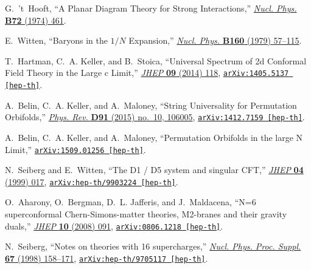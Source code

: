 \begin{thebibliography}{100}
G.~'t~Hooft, ``{A Planar Diagram Theory for Strong Interactions},''
\href{http://dx.doi.org/10.1016/0550-3213(74)90154-0}{{\em Nucl. Phys.} {\bf
  B72} (1974)  461}.

E.~Witten, ``{Baryons in the $1/N$ Expansion},''
\href{http://dx.doi.org/10.1016/0550-3213(79)90232-3}{{\em Nucl. Phys.} {\bf
  B160} (1979)  57--115}.

T.~Hartman, C.~A. Keller, and B.~Stoica, ``{Universal Spectrum of 2d Conformal
  Field Theory in the Large c Limit},''
  \href{http://dx.doi.org/10.1007/JHEP09(2014)118}{{\em JHEP} {\bf 09} (2014)
  118},
\href{http://arxiv.org/abs/1405.5137}{{\tt arXiv:1405.5137 [hep-th]}}.

A.~Belin, C.~A. Keller, and A.~Maloney, ``{String Universality for Permutation
  Orbifolds},'' \href{http://dx.doi.org/10.1103/PhysRevD.91.106005}{{\em Phys.
  Rev.} {\bf D91} (2015) no.~10, 106005},
\href{http://arxiv.org/abs/1412.7159}{{\tt arXiv:1412.7159 [hep-th]}}.

A.~Belin, C.~A. Keller, and A.~Maloney, ``{Permutation Orbifolds in the large N
  Limit},''
\href{http://arxiv.org/abs/1509.01256}{{\tt arXiv:1509.01256 [hep-th]}}.

N.~Seiberg and E.~Witten, ``{The D1 / D5 system and singular CFT},''
  \href{http://dx.doi.org/10.1088/1126-6708/1999/04/017}{{\em JHEP} {\bf 04}
  (1999)  017},
\href{http://arxiv.org/abs/hep-th/9903224}{{\tt arXiv:hep-th/9903224
  [hep-th]}}.

O.~Aharony, O.~Bergman, D.~L. Jafferis, and J.~Maldacena, ``{N=6 superconformal
  Chern-Simons-matter theories, M2-branes and their gravity duals},''
  \href{http://dx.doi.org/10.1088/1126-6708/2008/10/091}{{\em JHEP} {\bf 10}
  (2008)  091},
\href{http://arxiv.org/abs/0806.1218}{{\tt arXiv:0806.1218 [hep-th]}}.

N.~Seiberg, ``{Notes on theories with 16 supercharges},''
  \href{http://dx.doi.org/10.1016/S0920-5632(98)00128-5}{{\em Nucl. Phys. Proc.
  Suppl.} {\bf 67} (1998)  158--171},
\href{http://arxiv.org/abs/hep-th/9705117}{{\tt arXiv:hep-th/9705117
  [hep-th]}}.


\end{thebibliography}
